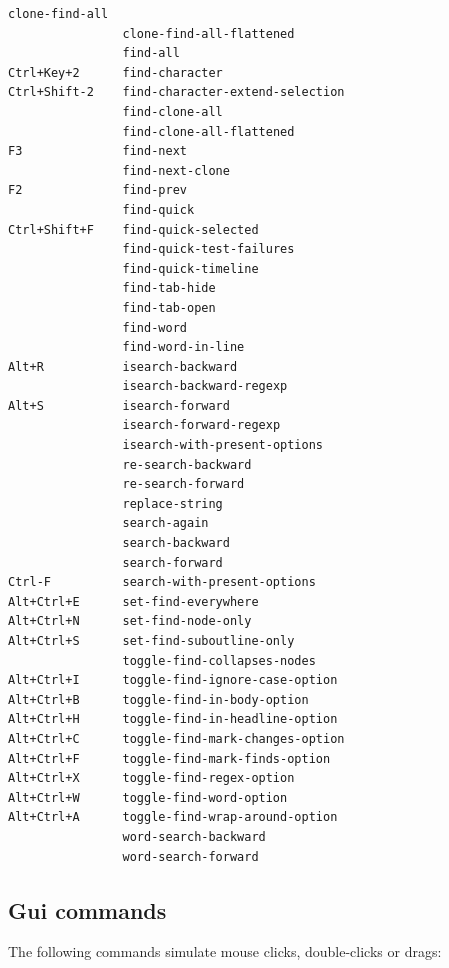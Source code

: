 \documentclass[a4paper,10pt,english]{sphinxmanual}
\begin{document}
\begin{Verbatim}[commandchars=\\\{\}]
                clone-find-all
                clone-find-all-flattened
                find-all
Ctrl+Key+2      find-character
Ctrl+Shift-2    find-character-extend-selection
                find-clone-all
                find-clone-all-flattened
F3              find-next
                find-next-clone
F2              find-prev
                find-quick
Ctrl+Shift+F    find-quick-selected
                find-quick-test-failures
                find-quick-timeline
                find-tab-hide
                find-tab-open
                find-word
                find-word-in-line
Alt+R           isearch-backward
                isearch-backward-regexp
Alt+S           isearch-forward
                isearch-forward-regexp
                isearch-with-present-options
                re-search-backward
                re-search-forward
                replace-string
                search-again
                search-backward
                search-forward
Ctrl-F          search-with-present-options
Alt+Ctrl+E      set-find-everywhere
Alt+Ctrl+N      set-find-node-only
Alt+Ctrl+S      set-find-suboutline-only
                toggle-find-collapses-nodes
Alt+Ctrl+I      toggle-find-ignore-case-option
Alt+Ctrl+B      toggle-find-in-body-option
Alt+Ctrl+H      toggle-find-in-headline-option
Alt+Ctrl+C      toggle-find-mark-changes-option
Alt+Ctrl+F      toggle-find-mark-finds-option
Alt+Ctrl+X      toggle-find-regex-option
Alt+Ctrl+W      toggle-find-word-option
Alt+Ctrl+A      toggle-find-wrap-around-option
                word-search-backward
                word-search-forward
\end{Verbatim}


\subsection{Gui commands}
\label{commands:gui-commands}
The following commands simulate mouse clicks, double-clicks or drags:
\end{document}
